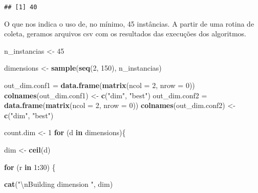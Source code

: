 \documentclass[]{article}
\newenvironment{Shaded}{\begin{snugshade}}{\end{snugshade}}
\newcommand{\CharTok}[1]{\textcolor[rgb]{0.31,0.60,0.02}{#1}}
\newcommand{\ControlFlowTok}[1]{\textcolor[rgb]{0.13,0.29,0.53}{\textbf{#1}}}
\newcommand{\DataTypeTok}[1]{\textcolor[rgb]{0.13,0.29,0.53}{#1}}
\newcommand{\DecValTok}[1]{\textcolor[rgb]{0.00,0.00,0.81}{#1}}
\newcommand{\KeywordTok}[1]{\textcolor[rgb]{0.13,0.29,0.53}{\textbf{#1}}}
\newcommand{\NormalTok}[1]{#1}
\newcommand{\OperatorTok}[1]{\textcolor[rgb]{0.81,0.36,0.00}{\textbf{#1}}}
\newcommand{\StringTok}[1]{\textcolor[rgb]{0.31,0.60,0.02}{#1}}
\begin{document}
\begin{verbatim}
## [1] 40
\end{verbatim}

O que nos indica o uso de, no mínimo, 45 instâncias. A partir de uma
rotina de coleta, geramos arquivos csv com os resultados das execuções
dos algoritmos.

\begin{Shaded}
\begin{Highlighting}[]
\NormalTok{n_instancias <-}\StringTok{ }\DecValTok{45}

\NormalTok{dimensions <-}\StringTok{ }\KeywordTok{sample}\NormalTok{(}\KeywordTok{seq}\NormalTok{(}\DecValTok{2}\NormalTok{, }\DecValTok{150}\NormalTok{), n_instancias)}

\NormalTok{out_dim.conf1 =}\StringTok{ }\KeywordTok{data.frame}\NormalTok{(}\KeywordTok{matrix}\NormalTok{(}\DataTypeTok{ncol =} \DecValTok{2}\NormalTok{, }\DataTypeTok{nrow =} \DecValTok{0}\NormalTok{))}
\KeywordTok{colnames}\NormalTok{(out_dim.conf1) <-}\StringTok{ }\KeywordTok{c}\NormalTok{(}\StringTok{"dim"}\NormalTok{, }\StringTok{"best"}\NormalTok{)}
\NormalTok{out_dim.conf2 =}\StringTok{ }\KeywordTok{data.frame}\NormalTok{(}\KeywordTok{matrix}\NormalTok{(}\DataTypeTok{ncol =} \DecValTok{2}\NormalTok{, }\DataTypeTok{nrow =} \DecValTok{0}\NormalTok{))}
\KeywordTok{colnames}\NormalTok{(out_dim.conf2) <-}\StringTok{ }\KeywordTok{c}\NormalTok{(}\StringTok{"dim"}\NormalTok{, }\StringTok{"best"}\NormalTok{)}

\NormalTok{count.dim <-}\StringTok{ }\DecValTok{1}
\ControlFlowTok{for}\NormalTok{ (d }\ControlFlowTok{in}\NormalTok{ dimensions)\{}

\NormalTok{    dim <-}\StringTok{ }\KeywordTok{ceil}\NormalTok{(d)}
    
    \ControlFlowTok{for}\NormalTok{ (r }\ControlFlowTok{in} \DecValTok{1}\OperatorTok{:}\DecValTok{30}\NormalTok{) \{}
        
    
        \KeywordTok{cat}\NormalTok{(}\StringTok{"}\CharTok{\textbackslash{}n}\StringTok{Building dimension "}\NormalTok{, dim)}
    

\end{Highlighting}
\end{Shaded}
\end{document}
